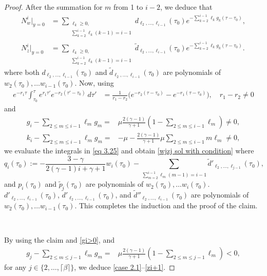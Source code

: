 \documentclass{article}
\newcommand{\ga}{\gamma}
\def\be{\begin{equation}}
\def\ee{\end{equation}}
\numberwithin{equation}{section}
\begin{document}
\begin{proof}
        After the summation for $m$ from 1 to $i-2$, we deduce that
         \begin{align*}
              N_w^i|_{y=0}&=  \sum_{\substack{\ell_k\geq 0,\\ \sum_{ k=2}^ { i-1} \ell_k (k-1) = i-1 }} d_{ \ell_2,\dots, \ell_{i-1}} (\tau_0) e^{-\sum_{ k=2}^ { i-1}\ell_kg_k(\tau-\tau_0)},\\
              N_z^i|_{y=0}&= \sum_{\substack{\ell_k\geq 0,\\ \sum_{ k=2}^ { i-1} \ell_k (k-1) = i-1 }} \tilde d_{ \ell_2,\dots, \ell_{i-1}}(\tau_0) e^{-\sum_{ k=2}^ { i-1}\ell_kg_k(\tau-\tau_0)}.
        \end{align*}
        where both $d_{ \ell_2,\dots, \ell_{i-1}} (\tau_0)$ and $\tilde d_{ \ell_2,\dots, \ell_{i-1}} (\tau_0)$ are polynomials of $w_2(\tau_0),\dots w_{i-1}(\tau_0)$.
       Now, using 
          \begin{align*}
        e^{-r_1\tau} \int_{\tau_0}^{\tau} e^{r_1\tau'} e^{-r_2(\tau'-\tau_0)} \ d\tau' &= \frac{1}{r_1-r_2} \big(e^{-r_2(\tau-\tau_0)}-e^{-r_1(\tau-\tau_0)}\big),\quad r_1-r_2\neq 0
        \end{align*} and  
        \begin{align*}
         g_i-\sum_{2\leq m \leq i-1}\ell_mg_m=&\mu  \frac{2(\ga-1)}{\ga+1}(1-\sum_{2\leq m \leq i-1}\ell_m) \neq 0,\\
         k_i-\sum_{2\leq m \leq i-1}\ell_mg_m
        =& -\mu-\frac{2(\ga-1)}{\ga+1}\mu\sum_{2\leq m \leq i-1}m\ell_m\neq 0,
        \end{align*}
        we evaluate the integrals in \eqref{eq 3.25} and obtain \eqref{wjzj sol with condition}
       where
      \be\label{qm}
           q_i(\tau_0):= -\frac{3-\ga}{2(\ga-1)i+\ga+1} w_i(\tau_0) - \sum_{\sum_{ m=2}^ { i-1} \ell_m (m-1) = i-1 } \tilde d'_{ \ell_2,\dots, \ell_{j-1}} (\tau_0),
        \ee
        and $p_i(\tau_0)$ and $\tilde p_i(\tau_0)$ are polynomials of $w_2(\tau_0),\dots w_{i}(\tau_0)$. $ d'_{ \ell_2,\dots, \ell_{i-1}}(\tau_0)$,  $\tilde d'_{ \ell_2,\dots, \ell_{i-1}}(\tau_0)$, and $\tilde d''_{ \ell_2,\dots, \ell_{i-1}}(\tau_0)$ are polynomials of $w_2(\tau_0),\dots w_{i-1}(\tau_0)$.
        This completes the induction and the proof of the claim.

        
    \

   
    By using the claim and \eqref{gi>0}, and
    \begin{align*}
         g_j-\sum_{2\leq m \leq j-1}\ell_mg_m=&\mu  \frac{2(\ga-1)}{\ga+1}(1-\sum_{2\leq m \leq j-1}\ell_m)<0,
    \end{align*}
    for any $j\in\{2,\dots,\lceil \beta \rceil\}$, we deduce  \eqref{case 2.1}–\eqref{zi+1}. 
\end{proof}
\end{document}
